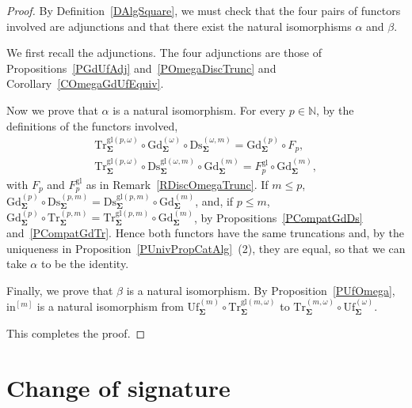 \documentclass[a4paper, reqno
]{amsart}
\newcommand{\sig}[1]{\mathbf{#1}}             %
\newcommand{\gl}{\mathrm{gl}}                %
\newcommand{\Gd}{\mathrm{Gd}}
\newcommand{\Uf}{\mathrm{Uf}}
\newcommand{\Ds}{\mathrm{Ds}}
\newcommand{\Tr}{\mathrm{Tr}}
\theoremstyle{plain}
\theoremstyle{definition}
\begin{document}
\begin{proof}
By Definition~\ref{DAlgSquare}, we must check that the four pairs of functors involved are adjunctions and that there exist the natural isomorphisms $\alpha$ and $\beta$.

We first recall the adjunctions.
The four adjunctions are those of Propositions~\ref{PGdUfAdj} and~\ref{POmegaDiscTrunc} and Corollary~\ref{COmegaGdUfEquiv}.

Now we prove that $\alpha$ is a natural isomorphism.
For every $p\in\mathbb{N}$, by the definitions of the functors involved,
\begin{gather*}
\Tr^{\gl(p,\omega)}_{\sig{\Sigma}}\circ\Gd^{(\omega)}_{\sig{\Sigma}}\circ\Ds^{(\omega,m)}_{\sig{\Sigma}}=\Gd^{(p)}_{\sig{\Sigma}}\circ F_{p},\\
\Tr^{\gl(p,\omega)}_{\sig{\Sigma}}\circ\Ds^{\gl(\omega,m)}_{\sig{\Sigma}}\circ\Gd^{(m)}_{\sig{\Sigma}}=F^{\gl}_{p}\circ\Gd^{(m)}_{\sig{\Sigma}},
\end{gather*}
with $F_{p}$ and $F^{\gl}_{p}$ as in Remark~\ref{RDiscOmegaTrunc}.
If $m\leq p$, $\Gd^{(p)}_{\sig{\Sigma}}\circ\Ds^{(p,m)}_{\sig{\Sigma}}=\Ds^{\gl(p,m)}_{\sig{\Sigma}}\circ\Gd^{(m)}_{\sig{\Sigma}}$, and, if $p\leq m$, $\Gd^{(p)}_{\sig{\Sigma}}\circ \Tr^{(p,m)}_{\sig{\Sigma}}=\Tr^{\gl(p,m)}_{\sig{\Sigma}}\circ\Gd^{(m)}_{\sig{\Sigma}}$, by Propositions~\ref{PCompatGdDs} and~\ref{PCompatGdTr}.
Hence both functors have the same truncations and, by the uniqueness in Proposition~\ref{PUnivPropCatAlg}~(2), they are equal, so that we can take $\alpha$ to be the identity.

Finally, we prove that $\beta$ is a natural isomorphism.
By Proposition~\ref{PUfOmega}, $\mathrm{in}^{[m]}$ is a natural isomorphism from $\Uf^{(m)}_{\sig{\Sigma}}\circ \Tr^{\gl(m,\omega)}_{\sig{\Sigma}}$ to $\Tr^{(m,\omega)}_{\sig{\Sigma}}\circ\Uf^{(\omega)}_{\sig{\Sigma}}$.

This completes the proof.
\end{proof}

\section{Change of signature}\label{SChangeSig}
\end{document}
